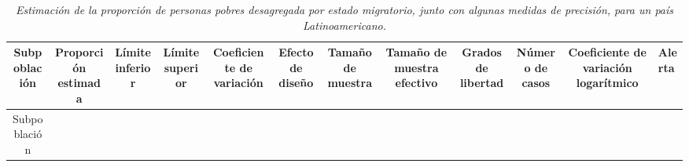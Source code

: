 \documentclass[12pt,spanish,]{book}
\begin{document}
\footnotesize

\begin{longtable}[]{@{}cccccccccccl@{}}
\caption{\emph{Estimación de la proporción de personas pobres desagregada por estado migratorio, junto con algunas medidas de precisión, para un país Latinoamericano.}
\label{T1}}\tabularnewline
\toprule
\begin{minipage}[b]{0.08\columnwidth}\centering
Subpoblación\strut
\end{minipage} & \begin{minipage}[b]{0.06\columnwidth}\centering
Proporción estimada\strut
\end{minipage} & \begin{minipage}[b]{0.04\columnwidth}\centering
Límite inferior\strut
\end{minipage} & \begin{minipage}[b]{0.04\columnwidth}\centering
Límite superior\strut
\end{minipage} & \begin{minipage}[b]{0.06\columnwidth}\centering
Coeficiente de variación\strut
\end{minipage} & \begin{minipage}[b]{0.04\columnwidth}\centering
Efecto de diseño\strut
\end{minipage} & \begin{minipage}[b]{0.05\columnwidth}\centering
Tamaño de muestra\strut
\end{minipage} & \begin{minipage}[b]{0.10\columnwidth}\centering
Tamaño de muestra efectivo\strut
\end{minipage} & \begin{minipage}[b]{0.05\columnwidth}\centering
Grados de libertad\strut
\end{minipage} & \begin{minipage}[b]{0.04\columnwidth}\centering
Número de casos\strut
\end{minipage} & \begin{minipage}[b]{0.11\columnwidth}\centering
Coeficiente de variación logarítmico\strut
\end{minipage} & \begin{minipage}[b]{0.01\columnwidth}\raggedright
Alerta\strut
\end{minipage}\tabularnewline
\midrule
\endfirsthead
\toprule
\begin{minipage}[b]{0.08\columnwidth}\centering
Subpoblación\strut
\end{minipage} & \begin{minipage}[b]{0.06\columnwidth}\centering

\end{minipage}
\end{longtable}
\end{document}
